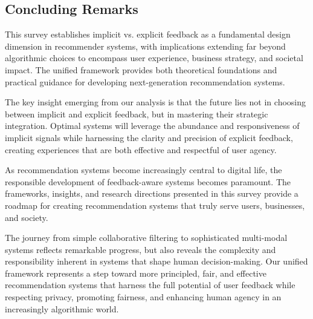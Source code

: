 \subsection{Concluding Remarks}

This survey establishes implicit vs. explicit feedback as a fundamental design dimension in recommender systems, with implications extending far beyond algorithmic choices to encompass user experience, business strategy, and societal impact. The unified framework provides both theoretical foundations and practical guidance for developing next-generation recommendation systems.

The key insight emerging from our analysis is that the future lies not in choosing between implicit and explicit feedback, but in mastering their strategic integration. Optimal systems will leverage the abundance and responsiveness of implicit signals while harnessing the clarity and precision of explicit feedback, creating experiences that are both effective and respectful of user agency.

As recommendation systems become increasingly central to digital life, the responsible development of feedback-aware systems becomes paramount. The frameworks, insights, and research directions presented in this survey provide a roadmap for creating recommendation systems that truly serve users, businesses, and society.

The journey from simple collaborative filtering to sophisticated multi-modal systems reflects remarkable progress, but also reveals the complexity and responsibility inherent in systems that shape human decision-making. Our unified framework represents a step toward more principled, fair, and effective recommendation systems that harness the full potential of user feedback while respecting privacy, promoting fairness, and enhancing human agency in an increasingly algorithmic world.
